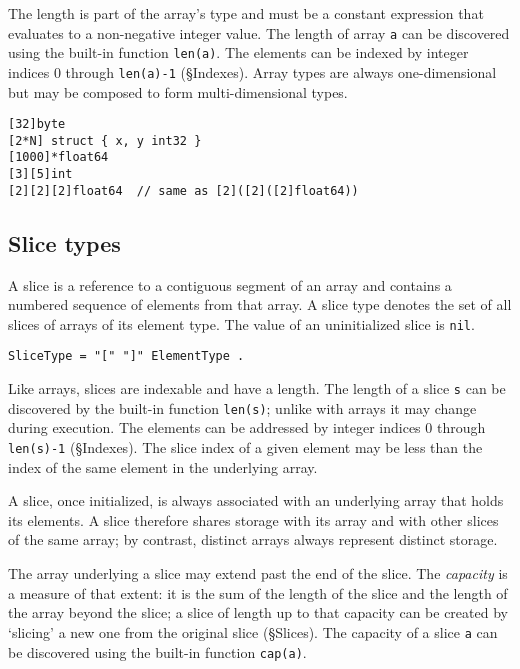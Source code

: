 The length is part of the array's type and must be a
constant expression that evaluates to
a non-negative integer value. The length of array \texttt{a} can be
discovered using the built-in function
\texttt{len(a)}. The elements can be
indexed by integer indices 0 through \texttt{len(a)-1}
(§Indexes). Array types are always one-dimensional
but may be composed to form multi-dimensional types.

\begin{Verbatim}[frame=single]
[32]byte
[2*N] struct { x, y int32 }
[1000]*float64
[3][5]int
[2][2][2]float64  // same as [2]([2]([2]float64))
\end{Verbatim}

\subsection*{Slice types}

A slice is a reference to a contiguous segment of an array and contains
a numbered sequence of elements from that array. A slice type denotes
the set of all slices of arrays of its element type. The value of an
uninitialized slice is \texttt{nil}.

\begin{Verbatim}[frame=single]
SliceType = "[" "]" ElementType .
\end{Verbatim}

Like arrays, slices are indexable and have a length. The length of a
slice \texttt{s} can be discovered by the built-in function
\texttt{len(s)}; unlike with arrays it
may change during execution. The elements can be addressed by integer
indices 0 through \texttt{len(s)-1} (§Indexes). The
slice index of a given element may be less than the index of the same
element in the underlying array.

A slice, once initialized, is always associated with an underlying array
that holds its elements. A slice therefore shares storage with its array
and with other slices of the same array; by contrast, distinct arrays
always represent distinct storage.

The array underlying a slice may extend past the end of the slice. The
\emph{capacity} is a measure of that extent: it is the sum of the length
of the slice and the length of the array beyond the slice; a slice of
length up to that capacity can be created by `slicing' a new one from
the original slice (§Slices). The capacity of a slice
\texttt{a} can be discovered using the built-in function
\texttt{cap(a)}.

